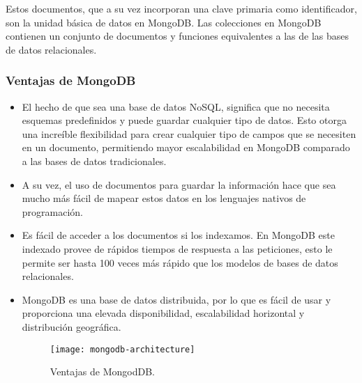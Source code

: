 Estos documentos, que a su vez incorporan una clave primaria como identificador, son la unidad básica de datos en MongoDB. Las colecciones en MongoDB contienen un conjunto de documentos y funciones equivalentes a las de las bases de datos relacionales.

\subsubsection{ Ventajas de MongoDB }


\begin{itemize}
    
    \item El hecho de que sea una base de datos NoSQL, significa que no necesita esquemas predefinidos y puede guardar cualquier tipo de datos. Esto otorga una increíble flexibilidad para crear cualquier tipo de campos que se necesiten en un documento, permitiendo mayor escalabilidad en MongoDB comparado a las bases de datos tradicionales.

    \item A su vez, el uso de documentos para guardar la información hace que sea mucho más fácil de mapear estos datos en los lenguajes nativos de programación.

    \item Es fácil de acceder a los documentos si los indexamos. En MongoDB este indexado provee de rápidos tiempos de respuesta a las peticiones, esto le permite ser hasta 100 veces más rápido que los modelos de bases de datos relacionales.

    \item MongoDB es una base de datos distribuida, por lo que es fácil de usar y proporciona una elevada disponibilidad, escalabilidad horizontal y distribución geográfica.
    
    \begin{figure}[h]
        \centering
        \texttt{[image: mongodb-architecture]}
        \caption{ Ventajas de MongodDB. }
        \label{fig:mongoDBarquitectura}
    \end{figure}

\end{itemize}


